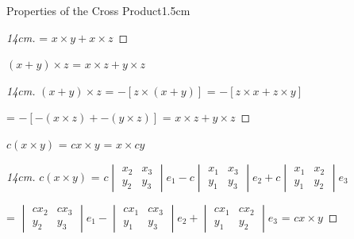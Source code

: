\begin{ltheorem}{Properties of the Cross Product}{1.5cm}
\begin{proof}[14cm]
                \hspace{0.1cm}
                = $x \times y + x \times z$
            \end{proof}

        \item $(x + y) \times z$ = $x \times z + y \times z$
        
            \begin{proof}[14cm]
                $(x + y) \times z$
                = $-[z \times (x+y)]$
                = $-[z \times x + z \times y]$

                \hspace{2cm}
                = $-[-(x \times z) + -(y \times z)]$
                = $x \times z + y \times z$
            \end{proof}

        \item $c(x \times y)$ = $cx \times y$ = $x \times cy$
        
            \begin{proof}[14cm]
                $c(x \times y)$ =
                $c\begin{vmatrix}
                    x_2 & x_3 \\
                    y_2 & y_3 
                \end{vmatrix}e_1
                - c\begin{vmatrix}
                    x_1 & x_3 \\
                    y_1 & y_3 
                \end{vmatrix}e_2
                + c\begin{vmatrix}
                    x_1 & x_2 \\
                    y_1 & y_2 
                \end{vmatrix}e_3$

                \hspace{1.5cm}
                = $\begin{vmatrix}
                    cx_2 & cx_3 \\
                    y_2 & y_3 
                \end{vmatrix}e_1
                - \begin{vmatrix}
                    cx_1 & cx_3 \\
                    y_1 & y_3 
                \end{vmatrix}e_2
                + \begin{vmatrix}
                    cx_1 & cx_2 \\
                    y_1 & y_2 
                \end{vmatrix}e_3$
                = $cx \times y$


\end{proof}
\end{ltheorem}
